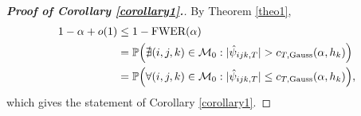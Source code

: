 \documentclass[a4paper,12pt]{article}
\numberwithin{equation}{section}
\begin{document}
{\color{red}
\begin{proof}[\textnormal{\textbf{Proof of Corollary \ref{corollary1}.}}]
By Theorem \ref{theo1}, 
\begin{align*}
1 - \alpha + o(1) 
 & \le 1 - \textnormal{FWER}(\alpha) \\
 & = \mathbb{P} \Big( \nexists (i,j,k) \in \mathcal{M}_0: |\hat{\psi}_{ijk,T}| > c_{T,\textnormal{Gauss}}(\alpha,h_k) \Big) \\
& = \mathbb{P}\Big( \forall (i,j,k) \in \mathcal{M}_0: |\hat{\psi}_{ijk,T}| \le c_{T,\textnormal{Gauss}}(\alpha,h_k) \Big),
\end{align*}
which gives the statement of Corollary \ref{corollary1}.
\end{proof}


}
\end{document}
